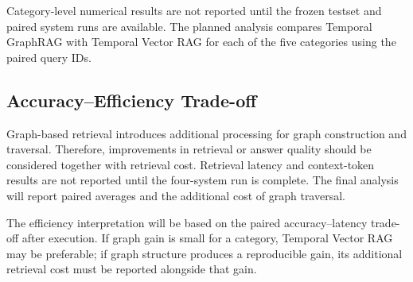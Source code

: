 \documentclass[conference]{IEEEtran}
\numberwithin{equation}{section}
\begin{document}
Category-level numerical results are not reported until the frozen testset and paired system runs are available. The planned analysis compares Temporal GraphRAG with Temporal Vector RAG for each of the five categories using the paired query IDs.

\subsection{Accuracy--Efficiency Trade-off}

Graph-based retrieval introduces additional processing for graph construction and traversal. Therefore, improvements in retrieval or answer quality should be considered together with retrieval cost. Retrieval latency and context-token results are not reported until the four-system run is complete. The final analysis will report paired averages and the additional cost of graph traversal.

The efficiency interpretation will be based on the paired accuracy--latency trade-off after execution. If graph gain is small for a category, Temporal Vector RAG may be preferable; if graph structure produces a reproducible gain, its additional retrieval cost must be reported alongside that gain.



\end{document}
